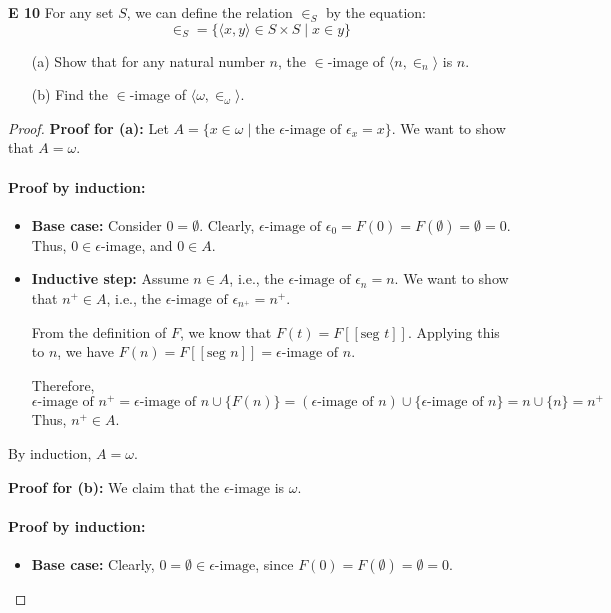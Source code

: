 \begin{question} \textbf{E 10}
    For any set \(S\), we can define the relation \(\in_S\) by the equation:
    \[
    \in_S = \{ \langle x, y \rangle \in S \times S \mid x \in y \}
    \]

    \begin{enumerate}
        \item[(a)] Show that for any natural number \(n\), the \(\in\)-image of \(\langle n, \in_n \rangle\) is \(n\).
        \item[(b)] Find the \(\in\)-image of \(\langle \omega, \in_\omega \rangle\).
    \end{enumerate}
\end{question}
\begin{proof}
    \textbf{Proof for (a):}
    Let \(A = \{ x \in \omega \mid \text{the } \epsilon\text{-image of } \epsilon_x = x \}\). We want to show that \(A = \omega\).

    \paragraph{Proof by induction:}
    \begin{itemize}
        \item \textbf{Base case:} Consider \(0 = \emptyset\). Clearly, \(\epsilon\text{-image of } \epsilon_0 = F(0) = F(\emptyset) = \emptyset = 0\). Thus, \(0 \in \epsilon\text{-image}\), and \(0 \in A\).

        \item \textbf{Inductive step:} Assume \(n \in A\), i.e., the \(\epsilon\text{-image of } \epsilon_n = n\). We want to show that \(n^+ \in A\), i.e., the \(\epsilon\text{-image of } \epsilon_{n^+} = n^+\).

        From the definition of \(F\), we know that \(F(t) = F[\![\text{seg } t]\!]\). Applying this to \(n\), we have \(F(n) = F[\![\text{seg } n]\!] = \epsilon\text{-image of } n\). 

        Therefore,
        \[
        \epsilon\text{-image of } n^+ = \epsilon\text{-image of } n \cup \{F(n)\}= (\epsilon\text{-image of } n) \cup \{\epsilon\text{-image of } n\} = n \cup \{n\} = n^+
        \]
        Thus, \(n^+ \in A\).
    \end{itemize}

    By induction, \(A = \omega\).

    \textbf{Proof for (b):}
    We claim that the \(\epsilon\text{-image}\) is \(\omega\).

    \paragraph{Proof by induction:}
    \begin{itemize}
        \item \textbf{Base case:} Clearly, \(0 = \emptyset \in \epsilon\text{-image}\), since \(F(0) = F(\emptyset) = \emptyset = 0\).


\end{itemize}
\end{proof}
